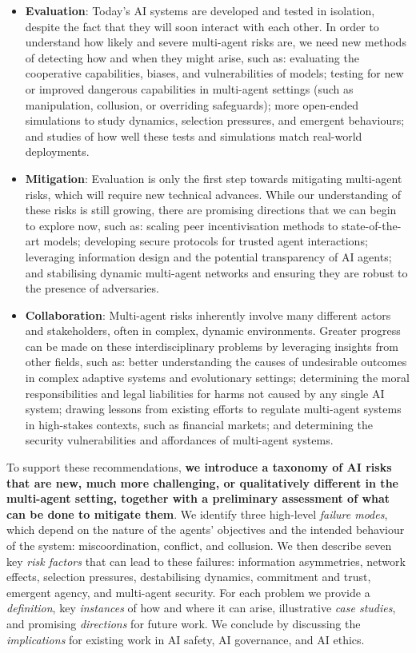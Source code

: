 \begin{itemize}
    \item \textbf{Evaluation}: Today's AI systems are developed and tested in isolation, despite the fact that they will soon interact with each other.
    In order to understand how likely and severe multi-agent risks are, we need new methods of detecting how and when they might arise, such as:
    evaluating the cooperative capabilities, biases, and vulnerabilities of models; 
    testing for new or improved dangerous capabilities in multi-agent settings (such as manipulation, collusion, or overriding safeguards); 
    more open-ended simulations to study dynamics, selection pressures, and emergent behaviours;
    and studies of how well these tests and simulations match real-world deployments. 
    \item \textbf{Mitigation}: Evaluation is only the first step towards mitigating multi-agent risks, which will require new technical advances.
    While our understanding of these risks is still growing, there are promising directions that we can begin to explore now, such as:
    scaling peer incentivisation methods to state-of-the-art models;
    developing secure protocols for trusted agent interactions; 
    leveraging information design and the potential transparency of AI agents; and
    stabilising dynamic multi-agent networks and ensuring they are robust to the presence of adversaries.
    \item \textbf{Collaboration}: Multi-agent risks inherently involve many different actors and stakeholders, often in complex, dynamic environments.
    Greater progress can be made on these interdisciplinary problems by leveraging insights from other fields, such as:
    better understanding the causes of undesirable outcomes in complex adaptive systems and evolutionary settings;
    determining the moral responsibilities and legal liabilities for harms not caused by any single AI system;
    drawing lessons from existing efforts to regulate multi-agent systems in high-stakes contexts, such as financial markets;
    and determining the security vulnerabilities and affordances of multi-agent systems.
\end{itemize}

To support these recommendations, \textbf{we introduce a taxonomy of AI risks that are new, much more challenging, or qualitatively different in the multi-agent setting, together with a preliminary assessment of what can be done to mitigate them}.
We identify three high-level \textit{failure modes}, which depend on the nature of the agents' objectives and the intended behaviour of the system: miscoordination, conflict, and collusion.
We then describe seven key \textit{risk factors} that can lead to these failures: information asymmetries, network effects, selection pressures, destabilising dynamics, commitment and trust, emergent agency, and multi-agent security.
For each problem we provide a \textit{definition}, key \textit{instances} of how and where it can arise, illustrative \emph{case studies}, and promising \textit{directions} for future work.
We conclude by discussing the \textit{implications} for existing work in AI safety, AI governance, and AI ethics.



